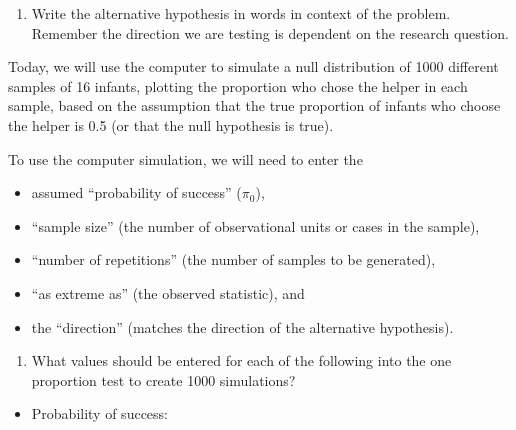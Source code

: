 \documentclass[
]{report}
\providecommand{\tightlist}{%
  \setlength{\itemsep}{0pt}\setlength{\parskip}{0pt}}
\begin{document}
\vspace{0.3in}

\begin{enumerate}
\def\labelenumi{\arabic{enumi}.}
\setcounter{enumi}{1}
\tightlist
\item
  Write the alternative hypothesis in words in context of the problem. Remember the direction we are testing is dependent on the research question.
\end{enumerate}

\vspace{0.8in}

Today, we will use the computer to simulate a null distribution of 1000 different samples of 16 infants, plotting the proportion who chose the helper in each sample, based on the assumption that the true proportion of infants who choose the helper is 0.5 (or that the null hypothesis is true).

\newpage

To use the computer simulation, we will need to enter the

\begin{itemize}
\tightlist
\item
  assumed ``probability of success'' (\(\pi_0\)),
\item
  ``sample size'' (the number of observational units or cases in the sample),
\item
  ``number of repetitions'' (the number of samples to be generated),
\item
  ``as extreme as'' (the observed statistic), and
\item
  the ``direction'' (matches the direction of the alternative hypothesis).
\end{itemize}

\begin{enumerate}
\def\labelenumi{\arabic{enumi}.}
\setcounter{enumi}{2}
\tightlist
\item
  What values should be entered for each of the following into the one proportion test to create 1000 simulations?
\end{enumerate}

\vspace{1mm}

\begin{itemize}
\tightlist
\item
  Probability of success:
\end{itemize}

\vspace{.2in}
\end{document}
